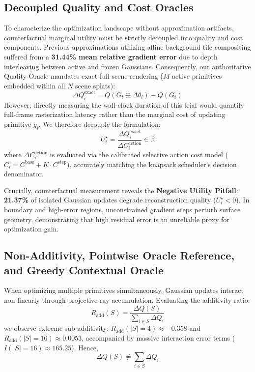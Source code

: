 \documentclass[10pt,twocolumn,letterpaper]{article}
\begin{document}
\subsection{Decoupled Quality and Cost Oracles}
To characterize the optimization landscape without approximation artifacts, counterfactual marginal utility must be strictly decoupled into quality and cost components. Previous approximations utilizing affine background tile compositing suffered from a \textbf{31.44\% mean relative gradient error} due to depth interleaving between active and frozen Gaussians. Consequently, our authoritative Quality Oracle mandates exact full-scene rendering ($M$ active primitives embedded within all $N$ scene splats):
\begin{equation}
\Delta Q_i^{\mathrm{exact}} = Q(G_t \oplus \Delta \theta_i) - Q(G_t)
\end{equation}
However, directly measuring the wall-clock duration of this trial would quantify full-frame rasterization latency rather than the marginal cost of updating primitive $g_i$. We therefore decouple the formulation:
\begin{equation}
U_i^\star = \frac{\Delta Q_i^{\mathrm{exact}}}{\Delta C_i^{\mathrm{action}}} \in \mathbb{R}
\end{equation}
where $\Delta C_i^{\mathrm{action}}$ is evaluated via the calibrated selective action cost model ($C_i = C^{\mathrm{base}} + K \cdot C^{\mathrm{step}}$), accurately matching the knapsack scheduler's decision denominator.

Crucially, counterfactual measurement reveals the \textbf{Negative Utility Pitfall}: \textbf{21.37\%} of isolated Gaussian updates degrade reconstruction quality ($U_i^\star < 0$). In boundary and high-error regions, unconstrained gradient steps perturb surface geometry, demonstrating that high residual error is an unreliable proxy for optimization gain.

\subsection{Non-Additivity, Pointwise Oracle Reference, and Greedy Contextual Oracle}
When optimizing multiple primitives simultaneously, Gaussian updates interact non-linearly through projective ray accumulation. Evaluating the additivity ratio:
\begin{equation}
R_{\mathrm{add}}(S) = \frac{\Delta Q(S)}{\sum_{i \in S} \Delta Q_i}
\end{equation}
we observe extreme sub-additivity: $R_{\mathrm{add}}(|S|=4) \approx -0.358$ and $R_{\mathrm{add}}(|S|=16) \approx 0.0053$, accompanied by massive interaction error terms ($I(|S|=16) \approx 165.25$). Hence,
\begin{equation}
\Delta Q(S) \neq \sum_{i \in S} \Delta Q_i
\end{equation}
\end{document}
